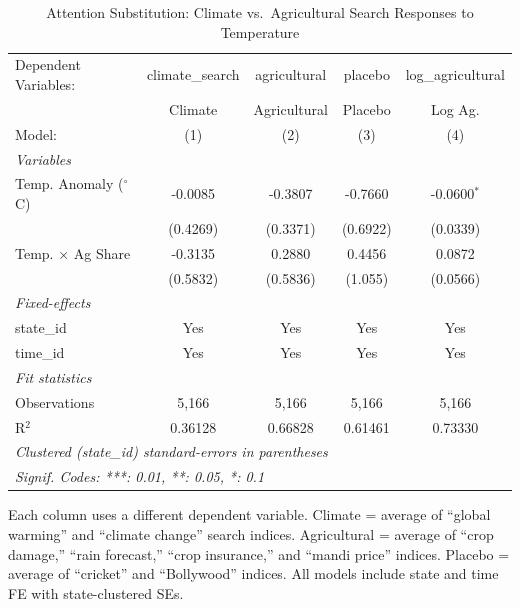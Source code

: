 
\begin{table}[htbp]
   \caption{\label{tab:substitution} Attention Substitution: Climate vs.\ Agricultural Search Responses to Temperature}
   \centering
   \begin{tabular}{lcccc}
      \tabularnewline \midrule \midrule
      Dependent Variables:       & climate\_search  & agricultural & placebo  & log\_agricultural\\   
                                 & Climate          & Agricultural & Placebo  & Log Ag. \\   
      Model:                     & (1)              & (2)          & (3)      & (4)\\  
      \midrule
      \emph{Variables}\\
      Temp. Anomaly ($^\circ$C)  & -0.0085          & -0.3807      & -0.7660  & -0.0600$^{*}$\\   
                                 & (0.4269)         & (0.3371)     & (0.6922) & (0.0339)\\   
      Temp. $\times$ Ag Share    & -0.3135          & 0.2880       & 0.4456   & 0.0872\\   
                                 & (0.5832)         & (0.5836)     & (1.055)  & (0.0566)\\   
      \midrule
      \emph{Fixed-effects}\\
      state\_id                  & Yes              & Yes          & Yes      & Yes\\  
      time\_id                   & Yes              & Yes          & Yes      & Yes\\  
      \midrule
      \emph{Fit statistics}\\
      Observations               & 5,166            & 5,166        & 5,166    & 5,166\\  
      R$^2$                      & 0.36128          & 0.66828      & 0.61461  & 0.73330\\  
      \midrule \midrule
      \multicolumn{5}{l}{\emph{Clustered (state\_id) standard-errors in parentheses}}\\
      \multicolumn{5}{l}{\emph{Signif. Codes: ***: 0.01, **: 0.05, *: 0.1}}\\
   \end{tabular}
   
   \par \raggedright 
   Each column uses a different dependent variable. Climate = average of ``global warming'' and ``climate change'' search indices. Agricultural = average of ``crop damage,'' ``rain forecast,'' ``crop insurance,'' and ``mandi price'' indices. Placebo = average of ``cricket'' and ``Bollywood'' indices. All models include state and time FE with state-clustered SEs.
\end{table}


